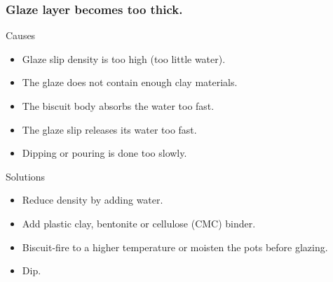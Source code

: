 \subsubsection{Glaze layer becomes too thick.}
Causes
\begin{itemize}
\item Glaze slip density is too high (too little water).
\item The glaze does not contain enough clay materials.
\item The biscuit body absorbs the water too fast.
\item The glaze slip releases its water too fast.
\item Dipping or pouring is done too slowly.
\end{itemize}
Solutions
\begin{itemize}
\item Reduce density by adding water.
\item Add plastic clay, bentonite or cellulose (CMC) binder.
\item Biscuit-fire to a higher temperature or moisten the pots before glazing.
\item Dip.
\end{itemize}
